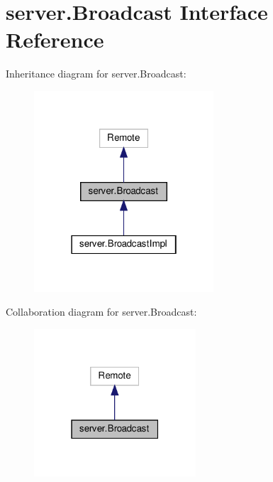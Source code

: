 \hypertarget{interfaceserver_1_1_broadcast}{}\section{server.\+Broadcast Interface Reference}
\label{interfaceserver_1_1_broadcast}


Inheritance diagram for server.\+Broadcast\+:
\nopagebreak
\begin{figure}[H]
\begin{center}
\leavevmode
\includegraphics[width=190pt]{interfaceserver_1_1_broadcast__inherit__graph}
\end{center}
\end{figure}


Collaboration diagram for server.\+Broadcast\+:
\nopagebreak
\begin{figure}[H]
\begin{center}
\leavevmode
\includegraphics[width=171pt]{interfaceserver_1_1_broadcast__coll__graph}
\end{center}
\end{figure}
